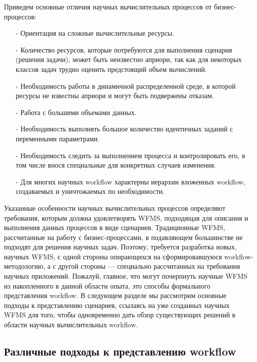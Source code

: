 \documentclass[a4paper,14pt]{article}
\begin{document}
Приведем основные отличия научных вычислительных процессов
от бизнес-процессов:
\begin{enumerate}
\item[-] Ориентация на сложные вычислительные ресурсы.
\item[-] Количество ресурсов, которые потребуются для выполнения сценария (решения задачи), может быть неизвестно априори, так как
для некоторых классов задач трудно оценить предстоящий объем
вычислений.
\item[-] Необходимость работы в динамичной распределенной среде, в которой ресурсы не известны априори и могут быть подвержены отказам.
\item[-] Работа с большими объемами данных.
\item[-] Необходимость выполнять большое количество идентичных заданий
с переменными параметрами.
\item[-] Необходимость следить за выполнением процесса и контролировать
его, в том числе внося специальные для конкретных случаев изменения.
\item[-]  Для многих научных workflow характерны иерархии вложенных workflow, создаваемых и уничтожаемых по необходимости.
\end{enumerate}

Указанные особенности научных вычислительных процессов определяют требования, которым должна удовлетворять WFMS, подходящая для
описания и выполнения данных процессов в виде сценариев. Традиционные WFMS, рассчитанные на работу с бизнес-процессами, в подавляющем
большинстве не подходят для решения научных задач. Поэтому, требуется
разработка новых, научных WFMS, с одной стороны опирающихся на сформировавшуюся workflow-методологию, а с другой стороны — специально
рассчитанных на требования научных приложений.
Пожалуй, главное, что могут почерпнуть научные WFMS из накопленного в данной области опыта, это способы формального представления workflow. В следующем разделе мы рассмотрим основные подходы
к представлению сценариев, ссылаясь на уже созданных научных WFMS для того, чтобы одновременно дать обзор существующих
решений в области научных вычислительных workflow.

\subsection*{Различные подходы к представлению workflow}
\end{document}
